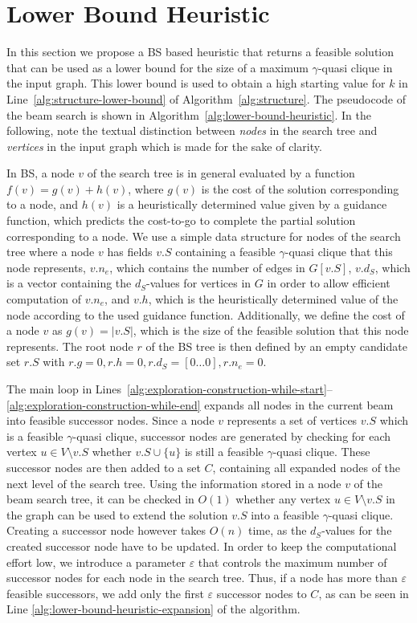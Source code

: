 \documentclass[draft,final]{vutinfth} %
\begin{document}
\section{Lower Bound Heuristic}\label{sec:lower-bound-heuristic}

In this section we propose a BS based heuristic that returns a feasible solution that can be used as a lower bound for the size of a maximum $\gamma$-quasi clique in the input graph. This lower bound is used to obtain a high starting value for $k$ in Line~\ref{alg:structure-lower-bound} of Algorithm~\ref{alg:structure}. 
The pseudocode of the beam search is shown in Algorithm~\ref{alg:lower-bound-heuristic}. 
In the following, note the textual distinction between \emph{nodes} in the search tree and \emph{vertices} in the input graph which is made for the sake of clarity. 

In BS, a node $v$ of the search tree is in general evaluated by a function $f(v) = g(v) + h(v)$, where $g(v)$ is the cost of the solution corresponding to a node, and $h(v)$ is a heuristically determined value given by a guidance function, which predicts the cost-to-go to complete the partial solution corresponding to a node. 
We use a simple data structure for nodes of the search tree where a node $v$ has fields $v.S$ containing a feasible $\gamma$-quasi clique that this node represents, $v.n_e$, which contains the number of edges in $G[v.S]$, $v.d_S$, which is a vector containing the $d_S$-values for vertices in $G$ in order to allow efficient computation of $v.n_e$, and $v.h$, which is the heuristically determined value of the node according to the used guidance function.
Additionally, we define the cost of a node $v$ as $g(v) = |v.S|$, which is the size of the feasible solution that this node represents.  
The root node $r$ of the BS tree is then defined by an empty candidate set $r.S$ with $r.g=0, r.h=0, r.d_S = [0 \dots 0], r.n_e = 0$. 

The main loop in Lines~\ref{alg:exploration-construction-while-start}--\ref{alg:exploration-construction-while-end} expands all nodes in the current beam into feasible successor nodes. 
Since a node $v$ represents a set of vertices $v.S$ which is a feasible $\gamma$-quasi clique, successor nodes are generated by checking for each vertex $u \in V \setminus v.S$ whether $v.S \cup \{u\}$ is still a feasible $\gamma$-quasi clique. These successor nodes are then added to a set $C$, containing all expanded nodes of the next level of the search tree. 
Using the information stored in a node $v$ of the beam search tree, it can be checked in $O(1)$ whether any vertex $u \in V \setminus v.S$ in the graph can be used to extend the solution $v.S$ into a feasible $\gamma$-quasi clique. Creating a successor node however takes $O(n)$ time, as the $d_S$-values for the created successor node have to be updated. 
In order to keep the computational effort low, we introduce a parameter $\varepsilon$ that controls the maximum number of successor nodes for each node in the search tree. Thus, if a node has more than $\varepsilon$ feasible successors, we add only the first $\varepsilon$ successor nodes to $C$, as can be seen in Line \ref{alg:lower-bound-heuristic-expansion} of the algorithm. 
\end{document}
